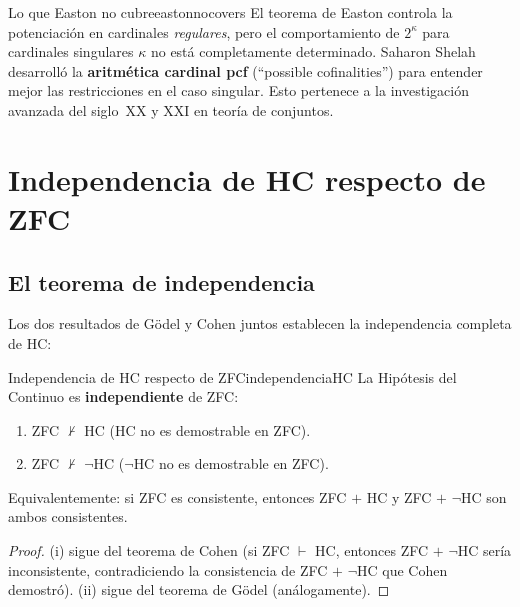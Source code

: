 \begin{observacion}{Lo que Easton no cubre}{eastonnocovers}
El teorema de Easton controla la potenciación en cardinales \emph{regulares}, pero el comportamiento de $2^\kappa$ para cardinales singulares $\kappa$ no está completamente determinado. Saharon Shelah desarrolló la \textbf{aritmética cardinal pcf} (``possible cofinalities'') para entender mejor las restricciones en el caso singular. Esto pertenece a la investigación avanzada del siglo~XX y XXI en teoría de conjuntos.
\end{observacion}

\section{Independencia de HC respecto de ZFC}

\subsection{El teorema de independencia}

Los dos resultados de Gödel y Cohen juntos establecen la independencia completa de HC:

\begin{teorema}{Independencia de HC respecto de ZFC}{independenciaHC}
La Hipótesis del Continuo es \textbf{independiente} de ZFC:
\begin{enumerate}[leftmargin=2em, label=(\roman*)]
  \item ZFC $\not\vdash$ HC \quad (HC no es demostrable en ZFC).
  \item ZFC $\not\vdash$ $\neg$HC \quad ($\neg$HC no es demostrable en ZFC).
\end{enumerate}
Equivalentemente: si ZFC es consistente, entonces ZFC $+$ HC y ZFC $+$ $\neg$HC son ambos consistentes.
\end{teorema}

\begin{proof}
(i) sigue del teorema de Cohen (si ZFC $\vdash$ HC, entonces ZFC $+$ $\neg$HC sería inconsistente, contradiciendo la consistencia de ZFC $+$ $\neg$HC que Cohen demostró). (ii) sigue del teorema de Gödel (análogamente).
\end{proof}

